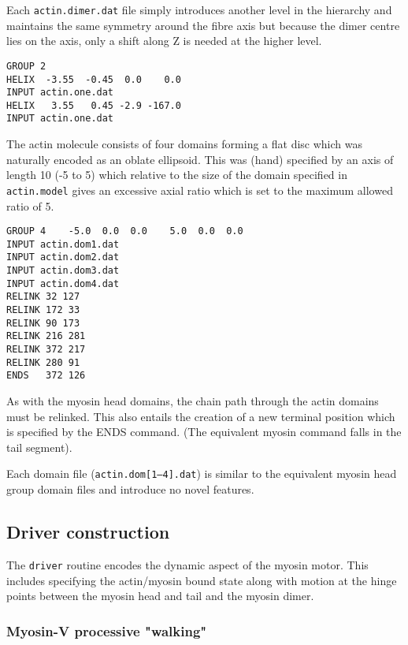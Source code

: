Each {\tt actin.dimer.dat} file simply introduces another level in the hierarchy
and maintains the same symmetry around the fibre axis but because the dimer centre lies on the
axis, only a shift along Z is needed at the higher level.

\begin{singlespace}
\begin{verbatim}
GROUP 2
HELIX  -3.55  -0.45  0.0    0.0
INPUT actin.one.dat
HELIX   3.55   0.45 -2.9 -167.0
INPUT actin.one.dat
\end{verbatim}
\end{singlespace}

The actin molecule consists of four domains forming a flat disc which was naturally encoded
as an oblate ellipsoid.   This was (hand) specified by an axis of length 10 (-5 to 5) which
relative to the size of the domain specified in {\tt actin.model} gives an excessive axial ratio 
which is set to the maximum allowed ratio of 5.

\begin{singlespace}
\begin{verbatim}
GROUP 4    -5.0  0.0  0.0    5.0  0.0  0.0
INPUT actin.dom1.dat
INPUT actin.dom2.dat
INPUT actin.dom3.dat
INPUT actin.dom4.dat
RELINK 32 127
RELINK 172 33
RELINK 90 173
RELINK 216 281
RELINK 372 217
RELINK 280 91
ENDS   372 126
\end{verbatim}
\end{singlespace}

As with the myosin head domains, the chain path through the actin domains must be relinked.
This also entails the creation of a new terminal position which is specified by the ENDS 
command.   (The equivalent myosin command falls in the tail segment).

Each domain file ({\tt actin.dom[1--4].dat}) is similar to the equivalent myosin head
group domain files and introduce no novel features.

\subsection{Driver construction}

The {\tt driver} routine encodes the dynamic aspect of the myosin motor.
This includes specifying the actin/myosin bound state along with motion
at the hinge points between the myosin head and tail and the myosin dimer.

\subsubsection{Myosin-V processive "walking"}


